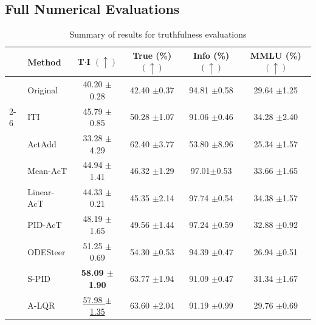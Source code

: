 \documentclass{article}
\theoremstyle{plain}
\theoremstyle{definition}
\theoremstyle{remark}
\begin{document}
\subsection{Full Numerical Evaluations}\label{ap:all_numbers}
\vspace{-15pt}
\begin{table}[H] %

    \centering %
    \footnotesize
    \setlength{\tabcolsep}{3pt} %
    \renewcommand{\arraystretch}{0.9}
    \begin{threeparttable}
    \caption{Summary of results for truthfulness evaluations}\label{ap:tab:tqa_results}
    \begin{tabular}{ll|>{\columncolor{lightblue}}ccc|c} %
    \toprule
    & \textbf{Method} & \textbf{T$\cdot$I $(\uparrow)$} 
    & \textbf{True (\%) $(\uparrow)$} 
    & \textbf{Info (\%) $(\uparrow)$} 
    & \textbf{MMLU (\%) $(\uparrow)$} \\
    \midrule
    & Original & 40.20 {\tiny $\pm$0.28} & 42.40 {\tiny $\pm$0.37} & 94.81 {\tiny $\pm$0.58} & 29.64 {\tiny $\pm$1.25} \\
    \cmidrule(lr){2-6}
    \multirow{7}{*}{\rotatebox{90}{Llama-3.2-1B}} 
    & ITI & 45.79 {\tiny $\pm$0.85} & 50.28 {\tiny $\pm$1.07} & 91.06 {\tiny $\pm$0.46} & 34.28 {\tiny $\pm$2.40} \\
    & ActAdd & 33.28 {\tiny $\pm$4.29} & 62.40 {\tiny $\pm$3.77} & 53.80 {\tiny $\pm$8.96} & 25.34 {\tiny $\pm$1.57} \\
    & Mean-AcT & 44.94 {\tiny $\pm$1.41} & 46.32 {\tiny $\pm$1.29} & 97.01{\tiny $\pm$0.53} & 33.66 {\tiny $\pm$1.65} \\
    & Linear-AcT & 44.33 {\tiny $\pm$0.21} & 45.35 {\tiny $\pm$2.14} & 97.74 {\tiny $\pm$0.54} & 34.38 {\tiny $\pm$1.57} \\
    & PID-AcT & 48.19 {\tiny $\pm$1.65} & 49.56 {\tiny $\pm$1.44} & 97.24 {\tiny $\pm$0.59} & 32.88 {\tiny $\pm$0.92}\\
    & ODESteer & 51.25 {\tiny $\pm$0.69} & 54.30 {\tiny $\pm$0.53} & 94.39 {\tiny $\pm$0.47} & 26.94 {\tiny $\pm$0.51} \\
    & S-PID & \textbf{58.09 {\tiny $\pm$1.90}} & 63.77 {\tiny $\pm$1.94} & 91.09 {\tiny $\pm$0.47} & 31.34 {\tiny $\pm$1.67} \\
    & A-LQR & \underline{57.98 {\tiny $\pm$1.35}} & 63.60 {\tiny $\pm$2.04} & 91.19 {\tiny $\pm$0.99} & 29.76 {\tiny $\pm$0.69}  \\
    

\end{tabular}
\end{threeparttable}
\end{table}
\end{document}

